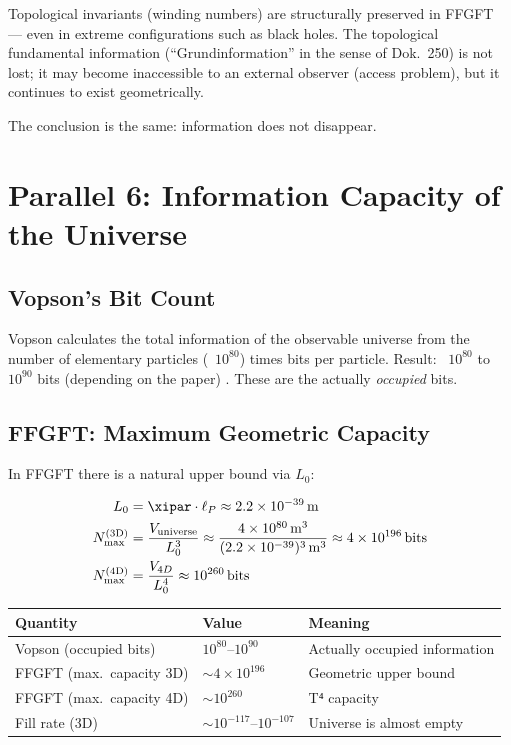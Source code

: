 Topological invariants (winding numbers) are structurally preserved in FFGFT ---
even in extreme configurations such as black holes. The topological fundamental
information (``Grundinformation'' in the sense of Dok.~250) is not lost; it
may become inaccessible to an external observer (access problem), but it
continues to exist geometrically.

The conclusion is the same: information does not disappear.

\section{Parallel 6: Information Capacity of the Universe}

\subsection{Vopson's Bit Count}

Vopson calculates the total information of the observable universe from the
number of elementary particles (~$10^{80}$) times bits per particle.
Result: ~$10^{80}$ to $10^{90}$ bits (depending on the paper) \cite{Vopson2023}.
These are the actually \emph{occupied} bits.

\subsection{FFGFT: Maximum Geometric Capacity}

In FFGFT there is a natural upper bound via $L_0$:

\begin{align}
  L_0 &= \xipar \cdot \ell_P \approx 2.2 \times 10^{-39}\,\text{m} \\
  N_\text{max}^\text{(3D)} &= \frac{V_\text{universe}}{L_0^3}
    \approx \frac{4 \times 10^{80}\,\text{m}^3}{(2.2 \times 10^{-39})^3\,\text{m}^3}
    \approx 4 \times 10^{196}\,\text{bits} \\
  N_\text{max}^\text{(4D)} &= \frac{V_{4D}}{L_0^4}
    \approx 10^{260}\,\text{bits}
\end{align}

\begin{longtable}{lll}
\toprule
Quantity & Value & Meaning \\
\midrule
Vopson (occupied bits) & $10^{80}$--$10^{90}$ & Actually occupied information \\
FFGFT (max.\ capacity 3D) & $\sim 4\times10^{196}$ & Geometric upper bound \\
FFGFT (max.\ capacity 4D) & $\sim 10^{260}$ & T⁴ capacity \\
Fill rate (3D) & $\sim 10^{-117}$--$10^{-107}$ & Universe is almost empty \\
\bottomrule
\end{longtable}

